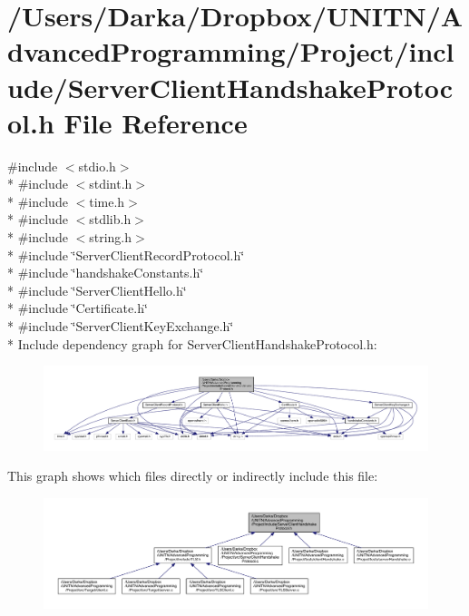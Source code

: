 \section{/\+Users/\+Darka/\+Dropbox/\+U\+N\+I\+T\+N/\+Advanced\+Programming/\+Project/include/\+Server\+Client\+Handshake\+Protocol.h File Reference}
\label{_server_client_handshake_protocol_8h}
{\ttfamily \#include $<$stdio.\+h$>$}\\*
{\ttfamily \#include $<$stdint.\+h$>$}\\*
{\ttfamily \#include $<$time.\+h$>$}\\*
{\ttfamily \#include $<$stdlib.\+h$>$}\\*
{\ttfamily \#include $<$string.\+h$>$}\\*
{\ttfamily \#include \char`\"{}Server\+Client\+Record\+Protocol.\+h\char`\"{}}\\*
{\ttfamily \#include \char`\"{}handshake\+Constants.\+h\char`\"{}}\\*
{\ttfamily \#include \char`\"{}Server\+Client\+Hello.\+h\char`\"{}}\\*
{\ttfamily \#include \char`\"{}Certificate.\+h\char`\"{}}\\*
{\ttfamily \#include \char`\"{}Server\+Client\+Key\+Exchange.\+h\char`\"{}}\\*
Include dependency graph for Server\+Client\+Handshake\+Protocol.\+h\+:\nopagebreak
\begin{figure}[H]
\begin{center}
\leavevmode
\includegraphics[width=350pt]{_server_client_handshake_protocol_8h__incl}
\end{center}
\end{figure}
This graph shows which files directly or indirectly include this file\+:\nopagebreak
\begin{figure}[H]
\begin{center}
\leavevmode
\includegraphics[width=350pt]{_server_client_handshake_protocol_8h__dep__incl}
\end{center}
\end{figure}

